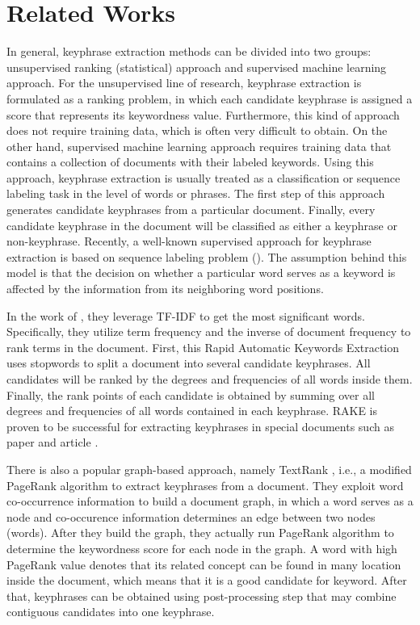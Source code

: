 \section{Related Works}
In general, keyphrase extraction methods can be divided into two groups: unsupervised ranking (statistical) approach and supervised machine learning approach. For the unsupervised line of research, keyphrase extraction is formulated as a ranking problem, in which each candidate keyphrase is assigned a score that represents its keywordness value. Furthermore, this kind of approach does not require training data, which is often very difficult to obtain. On the other hand, supervised machine learning approach requires training data that contains a collection of documents with their labeled keywords. Using this approach, keyphrase extraction is usually treated as a classification or sequence labeling task in the level of words or phrases. The first step of this approach generates candidate keyphrases from a particular document. Finally, every candidate keyphrase in the document will be classified as either a keyphrase or non-keyphrase. Recently, a well-known supervised approach for keyphrase extraction is based on sequence labeling problem (\cite{zhang2008automatic}\cite{cao2010automatically}\cite{zhang2016keyphrase}). The assumption behind this model is that the decision on whether a particular word serves as a keyword is affected by the information from its neighboring word positions.

In the work of \cite{sparck1972statistical}, they leverage TF-IDF to get the most significant words. Specifically, they utilize term frequency and the inverse of document frequency to rank terms in the document. First, this Rapid Automatic Keywords Extraction \cite{rake} uses stopwords to split a document into several candidate keyphrases. All candidates will be ranked by the degrees and frequencies of all words inside them. Finally, the rank points of each candidate is obtained by summing over all degrees and frequencies of all words contained in each keyphrase. RAKE is proven to be successful for extracting keyphrases in special documents such as paper and article \cite{rake}.

There is also a popular graph-based approach, namely TextRank \cite{mihalcea2004textrank}, i.e., a modified PageRank algorithm to extract keyphrases from a document. They exploit word co-occurrence information to build a document graph, in which a word serves as a node and co-occurence information determines an edge between two nodes (words). After they build the graph, they actually run PageRank algorithm to determine the keywordness score for each node in the graph. A word with high PageRank value denotes that its related concept can be found in many location inside the document, which means that it is a good candidate for keyword. After that, keyphrases can be obtained using post-processing step that may combine contiguous candidates into one keyphrase.

